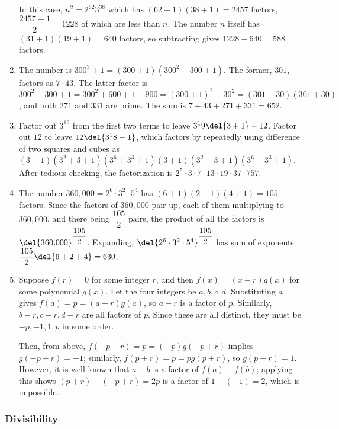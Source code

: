 \documentclass[10pt,paper=letter]{scrartcl}
\begin{document}
\begin{enumerate}
In this case, $n^2 = 2^{62}3^{38}$ which has $(62+1)(38+1) = 2457$ factors, $\dfrac{2457 - 1}2 = 1228$ of which are less than $n$. The number $n$ itself has $(31+1)(19+1) = 640$ factors, so subtracting gives $1228 - 640 = 588$ factors.

\item The number is $300^3 + 1 = (300 + 1)(300^2 - 300 + 1)$. The former, $301$, factors as $7 \cdot 43$. The latter factor is $300^2 - 300 + 1 = 300^2 + 600 + 1 - 900 = (300 + 1)^2 - 30^2 = (301 - 30)(301 + 30)$, and both $271$ and $331$ are prime. The sum is $7 + 43 + 271 + 331 = 652$.

\item Factor out $3^19$ from the first two terms to leave $3^19\del{3 + 1} - 12$. Factor out $12$ to leave $12\del{3^18 - 1}$, which factors by repeatedly using difference of two squares and cubes as $(3-1)(3^2 + 3 + 1)(3^6 + 3^3 + 1)(3 + 1)(3^2 - 3 + 1)(3^6 - 3^3 + 1)$. After tedious checking, the factorization is $2^5 \cdot 3 \cdot 7 \cdot 13 \cdot 19 \cdot 37 \cdot 757$.

\item The number $360{,}000 = 2^6 \cdot 3^2 \cdot 5^4$ has $(6+1)(2+1)(4+1) = 105$ factors. Since the factors of $360{,}000$ pair up, each of them multiplying to $360{,}000$, and there being $\dfrac{105}2$ pairs, the product of all the factors is $\del{360{,}000}^{\dfrac{105}2}$. Expanding, $\del{2^6 \cdot 3^2 \cdot 5^4}^{\dfrac{105}2}$ has sum of exponents $\dfrac{105}2\del{6 + 2+ 4} = 630$.

\item Suppose $f(r) = 0$ for some integer $r$, and then $f(x) = (x-r)g(x)$ for some polynomial $g(x)$. Let the four integers be $a, b, c, d$. Substituting $a$ gives $f(a) = p = (a-r)g(a)$, so $a-r$ is a factor of $p$. Similarly, $b-r, c-r, d-r$ are all factors of $p$. Since these are all distinct, they must be $-p, -1, 1, p$ in some order.

Then, from above, $f(-p+r) = p = (-p)g(-p+r)$ implies $g(-p+r) = -1$; similarly, $f(p+r) = p = pg(p+r)$, so $g(p+r) = 1$. However, it is well-known that $a - b$ is a factor of $f(a) - f(b)$; applying this shows $(p+r) - (-p+r) = 2p$ is a factor of $1 - (-1) = 2$, which is impossible.

\end{enumerate}

\subsubsection*{Divisibility}
\end{document}

